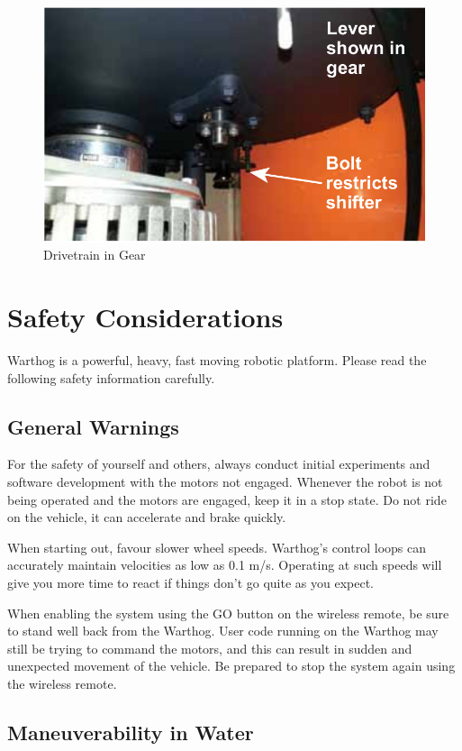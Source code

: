 \documentclass[]{clearpath-latex/clearpath-manual}
\begin{document}
\begin{figure}[!t]
  \centering
  \includegraphics[width=0.75\linewidth]{graphics/drivetrain-gear.png}
  \caption{Drivetrain in Gear}
  \label{drivetrain-g}
\end{figure}


\section{Safety Considerations}

Warthog is a powerful, heavy, fast moving robotic platform. Please read the following safety information carefully.

\subsection{General Warnings}

For the safety of yourself and others, always conduct initial experiments and software development with the motors not engaged.  Whenever the robot is not being operated and the motors are engaged, keep it in a stop state.  Do not ride on the vehicle, it can accelerate and brake quickly.

When starting out, favour slower wheel speeds. Warthog's control loops can accurately maintain velocities as low as 0.1 m/s. Operating at such speeds will give you more time to react if things don’t go quite as you expect.

When enabling the system using the GO button on the wireless remote, be sure to stand well back from the Warthog. User code running on the Warthog may still be trying to command the motors, and this can result in sudden and unexpected movement of the vehicle. Be prepared to stop the system again using the wireless remote.


\subsection{Maneuverability in Water}
\end{document}
